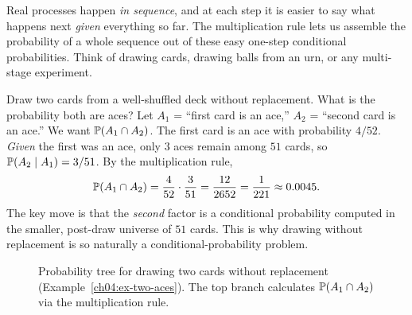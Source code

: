 Real processes happen \emph{in sequence}, and at each step it is easier to say what happens next \emph{given} everything so far. The multiplication rule lets us assemble the probability of a whole sequence out of these easy one-step conditional probabilities. Think of drawing cards, drawing balls from an urn, or any multi-stage experiment.

\begin{example}
\label{ch04:ex-two-aces}
Draw two cards from a well-shuffled deck without replacement. What is the probability both are aces? Let $A_1$ = ``first card is an ace,'' $A_2$ = ``second card is an ace.'' We want $\P(A_1 \cap A_2)$. The first card is an ace with probability $4/52$. \emph{Given} the first was an ace, only $3$ aces remain among $51$ cards, so $\P(A_2 \given A_1) = 3/51$. By the multiplication rule,
\[
\P(A_1 \cap A_2) = \frac{4}{52}\cdot\frac{3}{51} = \frac{12}{2652} = \frac{1}{221} \approx 0.0045.
\]
The key move is that the \emph{second} factor is a conditional probability computed in the smaller, post-draw universe of $51$ cards. This is why drawing without replacement is so naturally a conditional-probability problem.

\begin{figure}[H]
\centering
{}
\caption{Probability tree for drawing two cards without replacement (Example~\ref{ch04:ex-two-aces}). The top branch calculates $\P(A_1 \cap A_2)$ via the multiplication rule.}
\label{ch04:fig-two-aces}
\end{figure}

\end{example}

